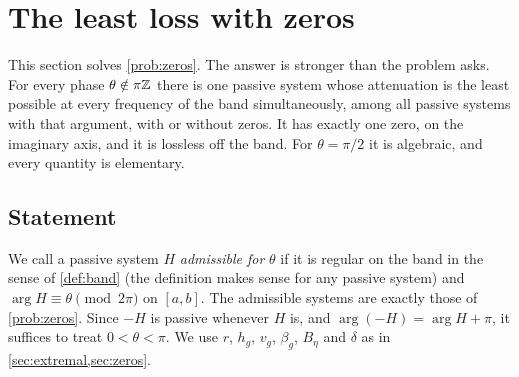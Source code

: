 \section{The least loss with zeros}\label{sec:allzeros}

This section solves \cref{prob:zeros}. The answer is stronger than the
problem asks. For every phase $\theta\notin\pi\mathbb Z$ there is one passive system
whose attenuation is the least possible at every frequency of the band
simultaneously, among all passive systems with that argument, with or
without zeros. It has exactly one zero, on the imaginary axis, and it is
lossless off the band. For $\theta=\pi/2$ it is algebraic, and every quantity
is elementary.

\subsection{Statement}

We call a passive system $H$ \emph{admissible for} $\theta$ if it is regular
on the band in the sense of \cref{def:band} (the definition makes sense for
any passive system) and $\arg H\equiv\theta\pmod{2\pi}$ on $[a,b]$. The
admissible systems are exactly those of \cref{prob:zeros}. Since $-H$ is
passive whenever $H$ is, and $\arg(-H)=\arg H+\pi$, it suffices to treat
$0<\theta<\pi$. We use $r$, $h_g$, $v_g$, $\beta_g$, $B_\eta$ and $\delta$ as in
\cref{sec:extremal,sec:zeros}.

